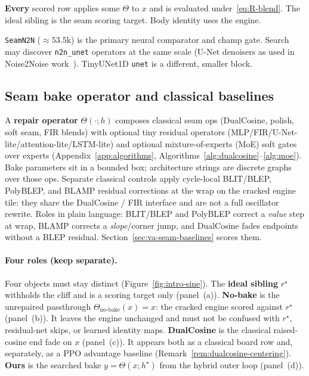 \textbf{Every} scored row applies some $\Theta$ to $x$ and is evaluated under~\eqref{eq:R-blend}.
The ideal sibling is the seam scoring target. Body identity uses the engine.

\begin{remark}
\label{rem:n2n}
\texttt{SeamN2N} (${\approx}53.5$k) is the primary neural comparator and champ gate.
Search may discover \texttt{n2n\_unet} operators at the same scale (U-Net denoisers as used in Noise2Noise work~\cite{lehtinen2018,kashyap2021n2n}). TinyUNet1D \texttt{unet} is a different, smaller block.
\end{remark}

\subsection{Seam bake operator and classical baselines}
\label{sec:bake}

A \textbf{repair operator} $\Theta(\cdot;h)$ composes classical seam ops (DualCosine, polish, soft seam, FIR blends) with optional tiny residual operators (MLP/FIR/U-Net-lite/attention-lite/LSTM-lite) and optional mixture-of-experts (MoE) soft gates over experts (Appendix~\ref{app:algorithms}, Algorithms~\ref{alg:dualcosine}--\ref{alg:moe}).
Bake parameters sit in a bounded box; architecture strings are discrete graphs over those ops.
Separate classical controls apply cycle-local BLIT/BLEP, PolyBLEP, and BLAMP residual corrections at the wrap on the cracked engine tile: they share the DualCosine / FIR interface and are not a full oscillator rewrite.
Roles in plain language: BLIT/BLEP and PolyBLEP correct a \emph{value} step at wrap, BLAMP corrects a \emph{slope}/corner jump, and DualCosine fades endpoints without a BLEP residual.
Section~\ref{sec:va-seam-baselines} scores them.

\paragraph{Four roles (keep separate).}
\label{sec:four-roles}
Four objects must stay distinct (Figure~\ref{fig:intro-sine}).
The \textbf{ideal sibling} $r^{\star}$ withholds the cliff and is a scoring target only (panel~(a)).
\textbf{No-bake} is the unrepaired passthrough $\Theta_{\mathrm{no\text{-}bake}}(x)=x$: the cracked engine scored against $r^{\star}$ (panel~(b)).
It leaves the engine unchanged and must not be confused with $r^{\star}$, residual-net skips, or learned identity maps.
\textbf{DualCosine} is the classical raised-cosine end fade on $x$ (panel~(c)).
It appears both as a classical board row and, separately, as a PPO advantage baseline (Remark~\ref{rem:dualcosine-centering}).
\textbf{Ours} is the searched bake $y=\Theta(x;h^{\star})$ from the hybrid outer loop (panel~(d)).

